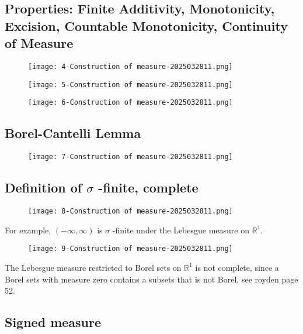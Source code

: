 \subsection{Properties: Finite Additivity, Monotonicity, Excision, Countable Monotonicity, Continuity of Measure}

\begin{figure}[H]
\centering
\texttt{[image: 4-Construction of measure-2025032811.png]}
\label{}
\end{figure}
\begin{figure}[H]
\centering
\texttt{[image: 5-Construction of measure-2025032811.png]}
\label{}
\end{figure}
\begin{figure}[H]
\centering
\texttt{[image: 6-Construction of measure-2025032811.png]}
\label{}
\end{figure}

\subsection{Borel-Cantelli Lemma}

\begin{figure}[H]
\centering
\texttt{[image: 7-Construction of measure-2025032811.png]}
\label{}
\end{figure}

\subsection{Definition of \texorpdfstring{$\sigma$}{sigma} -finite, complete}

\begin{figure}[H]
\centering
\texttt{[image: 8-Construction of measure-2025032811.png]}
\label{}
\end{figure}
For example, $(-\infty,\infty)$ is $\sigma$ -finite under the Lebesgue measure on $\mathbb{R}^{1}$.
\begin{figure}[H]
\centering
\texttt{[image: 9-Construction of measure-2025032811.png]}
\label{}
\end{figure}
The Lebesgue measure restricted to Borel sets on $\mathbb{R}^{1}$ is not complete, since a Borel sets with measure zero contains a subsets that is not Borel, see royden page 52.

\subsection{Signed measure}

